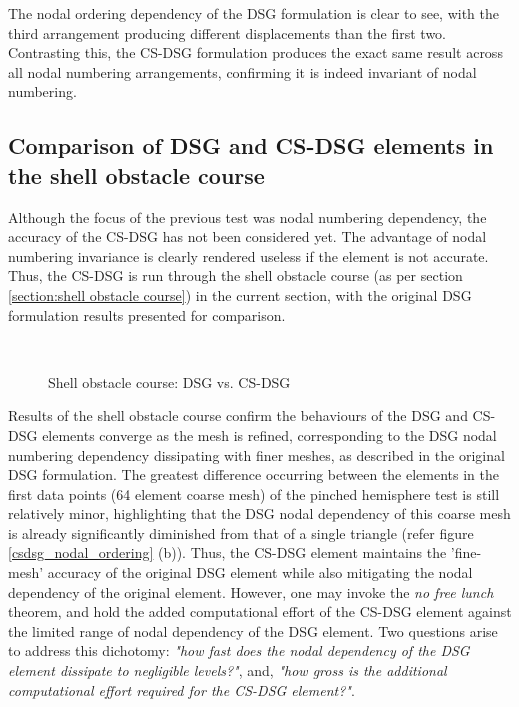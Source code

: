 The nodal ordering dependency of the DSG formulation is clear to see, with the third arrangement producing different displacements than the first two. Contrasting this, the CS-DSG formulation produces the exact same result across all nodal numbering arrangements, confirming it is indeed invariant of nodal numbering.

\subsection{Comparison of DSG and CS-DSG elements in the shell obstacle course}
Although the focus of the previous test was nodal numbering dependency, the accuracy of the CS-DSG has not been considered yet. The advantage of nodal numbering invariance is clearly rendered useless if the element is not accurate. Thus, the CS-DSG is run through the shell obstacle course (as per section \ref{section:shell obstacle course}) in the current section, with the original DSG formulation results presented for comparison.

\begin{figure}[H]
	\\
	\caption{\label{csdsg_shell_obstacl}Shell obstacle course: DSG vs. CS-DSG}
\end{figure}

Results of the shell obstacle course confirm the behaviours of the DSG and CS-DSG elements converge as the mesh is refined, corresponding to the DSG nodal numbering dependency dissipating with finer meshes, as described in the original DSG formulation. The greatest difference occurring between the elements in the first data points (64 element coarse mesh) of the pinched hemisphere test is still relatively minor, highlighting that the DSG nodal dependency of this coarse mesh is already significantly diminished from that of a single triangle (refer figure \ref{csdsg_nodal_ordering} (b)). Thus, the CS-DSG element maintains the 'fine-mesh' accuracy of the original DSG element while also mitigating the nodal dependency of the original element. However, one may invoke the \textit{no free lunch} theorem, and hold the added computational effort of the CS-DSG element against the limited range of nodal dependency of the DSG element. Two questions arise to address this dichotomy: \textit{"how fast does the nodal dependency of the DSG element dissipate to negligible levels?"}, and, 
 \textit{"how gross is the additional computational effort required for the CS-DSG element?"}. 
 

